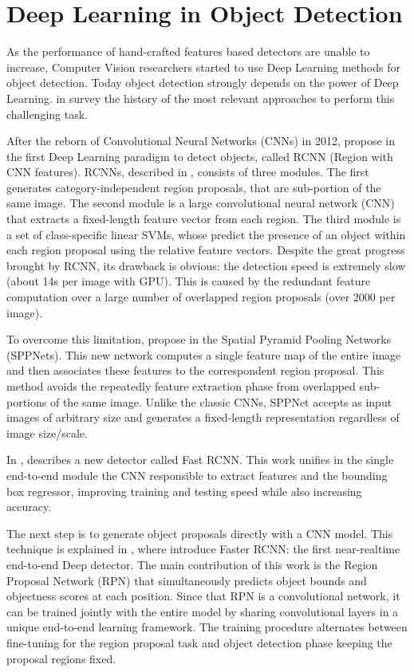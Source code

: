  \section{Deep Learning in Object Detection}
 As the performance of hand-crafted features based detectors are unable to increase, Computer Vision researchers started to use Deep Learning methods for object detection. Today object detection strongly depends on the power of Deep Learning. \citeauthor{computervisionsurvey} in \cite{computervisionsurvey} survey the history of the most relevant approaches to perform this challenging task. 
 
 After the reborn of Convolutional Neural Networks (CNNs) in 2012, \citeauthor{rcnn} propose in \cite{rcnn} the first Deep Learning paradigm to detect objects, called RCNN (Region with CNN features). RCNNs, described in \cite{rcnn}, consists of three modules. The first generates category-independent region proposals, that are sub-portion of the same image. The second module is a large convolutional neural network (CNN) that extracts a fixed-length feature
 vector from each region. The third module is a set of class-specific linear SVMs, whose predict the presence of an object within each region proposal using the relative feature vectors. Despite the great progress brought by RCNN, its drawback is obvious: the detection speed is extremely slow (about 14s per
 image with GPU). This is caused by the redundant feature computation over a large number of overlapped region proposals (over 2000 per image).
 
 To overcome this limitation, \citeauthor{sppnet} propose in \cite{sppnet} the Spatial Pyramid Pooling Networks (SPPNets). This new network computes a single feature map of the entire image and then associates these features to the correspondent region proposal. This method avoids the repeatedly feature extraction phase from overlapped sub-portions of the same image.  Unlike the classic CNNs, SPPNet accepts as input images of arbitrary size and generates a fixed-length representation regardless of image size/scale. 
 
 In \cite{fastrcnn}, \citeauthor{fastrcnn} describes a new detector called Fast RCNN. This work unifies in the single end-to-end module the CNN responsible to extract features and the bounding box regressor, improving training and testing speed while also increasing accuracy. 
 
 The next step is to generate object proposals directly with a CNN model. This technique is explained in \cite{fasterrcnn}, where \citeauthor{fasterrcnn} introduce Faster RCNN: the first near-realtime
 end-to-end Deep detector. The main contribution of this work is the Region Proposal Network (RPN) that simultaneously predicts object bounds and objectness scores at each position. Since that RPN is a convolutional network, it can be trained jointly with the entire model by sharing convolutional layers in a unique end-to-end learning framework. The training procedure alternates between fine-tuning for the region proposal task and object detection phase keeping the proposal regions fixed. 
 
